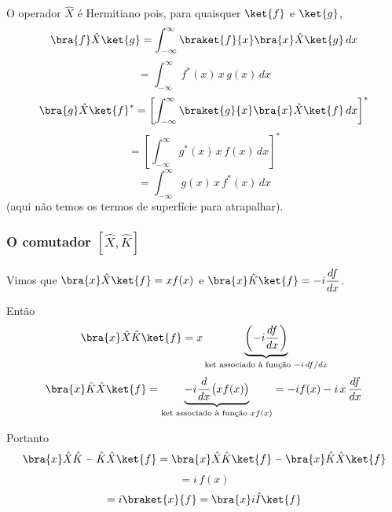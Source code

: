 O operador $\hat{X}$ é Hermitiano pois, para quaisquer $\ket{f}$ e $\ket{g}$,
\begin{equation}
\bra{f}\hat{X}\ket{g} = \int_{-\infty}^{\infty} \braket{f}{x}\bra{x}\hat{X}\ket{g}\,dx
\label{eq:aula7_X_hermitiano1}
\end{equation}
\begin{equation}
= \int_{-\infty}^{\infty} f^*(x)\,x\,g(x)\,dx
\label{eq:aula7_X_hermitiano2}
\end{equation}
\begin{equation}
\bra{g}\hat{X}\ket{f}^* = \left[\int_{-\infty}^{\infty}\braket{g}{x}\bra{x}\hat{X}\ket{f}\,dx\right]^*
\label{eq:aula7_X_hermitiano3}
\end{equation}
\begin{equation}
= \left[\int_{-\infty}^{\infty} g^*(x)\,x\,f(x)\,dx\right]^*
\label{eq:aula7_X_hermitiano4}
\end{equation}
\begin{equation}
= \int_{-\infty}^{\infty} g(x)\,x\,f^*(x)\,dx
\label{eq:aula7_X_hermitiano5}
\end{equation}
(aqui não temos os termos de superfície para atrapalhar).

\subsubsection*{O comutador $[\hat{X},\hat{K}]$}

Vimos que $\bra{x}\hat{X}\ket{f} = x f(x)$ e $\bra{x}\hat{K}\ket{f} = -i\dfrac{df}{dx}$.

Então
\begin{equation}
\bra{x}\hat{X}\hat{K}\ket{f} = x\underbrace{\left(-i\frac{df}{dx}\right)}_{\text{ket associado à função } -i\,df/dx}
\label{eq:aula7_XK}
\end{equation}
\begin{equation}
\bra{x}\hat{K}\hat{X}\ket{f} = \underbrace{-i\frac{d}{dx}\big(x f(x)\big)}_{\text{ket associado à função } x f(x)} = -i f(x) - i\,x\,\frac{df}{dx}
\label{eq:aula7_KX}
\end{equation}

Portanto
\begin{equation}
\bra{x}\hat{X}\hat{K} - \hat{K}\hat{X}\ket{f} = \bra{x}\hat{X}\hat{K}\ket{f} - \bra{x}\hat{K}\hat{X}\ket{f}
\label{eq:aula7_comutador_passo1}
\end{equation}
\begin{equation}
= i\,f(x)
\label{eq:aula7_comutador_passo2}
\end{equation}
\begin{equation}
= i\braket{x}{f} = \bra{x}i\hat{I}\ket{f}
\label{eq:aula7_comutador_passo3}
\end{equation}


